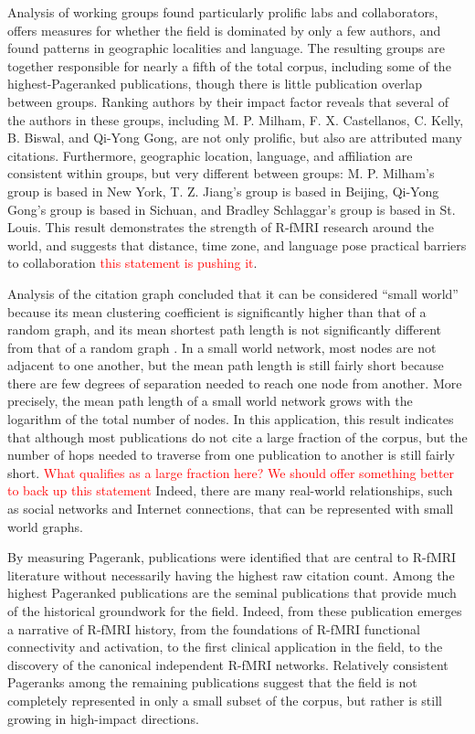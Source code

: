 \documentclass[5p]{elsarticle}
\begin{document}
Analysis of working groups found particularly prolific labs and collaborators,
offers measures for whether the field is dominated by only a few authors, and
found patterns in geographic localities and language. The resulting groups are
together responsible for nearly a fifth of the total corpus, including some of
the highest-Pageranked publications, though there is little publication overlap
between groups. Ranking authors by their impact factor reveals that several of
the authors in these groups, including M. P. Milham, F. X. Castellanos, C.
Kelly, B. Biswal, and Qi-Yong Gong, are not only prolific, but also are attributed many
citations. Furthermore, geographic location, language, and affiliation are
consistent within groups, but very different between groups: M. P. Milham’s group
is based in New York, T. Z. Jiang’s group is based in Beijing, Qi-Yong Gong’s
group is based in Sichuan, and Bradley Schlaggar’s group is based in St. Louis.
This result demonstrates the strength of R-fMRI research around the world, and
suggests that distance, time zone, and language pose practical barriers to
collaboration \textcolor{red}{this statement is pushing it}.

Analysis of the citation graph concluded that it can be considered ``small
world'' because its mean clustering coefficient is significantly higher than
that of a random graph, and its mean shortest path length is not significantly
different from that of a random graph \cite{Watts1998}. In a small world network, most nodes
are not adjacent to one another, but the mean path length is still fairly short
because there are few degrees of separation needed to reach one node from
another. More precisely, the mean path length of a small world network grows
with the logarithm of the total number of nodes. In this application, this
result indicates that although most publications do not cite a large fraction of the
corpus, but the number of hops needed to traverse from one publication to
another is still fairly short. \textcolor{red}{What qualifies as a large
fraction here? We should offer something better to back up this statement} Indeed, there are many real-world relationships,
such as social networks and Internet connections, that can be represented with
small world graphs. 

By measuring Pagerank, publications were identified that are central to R-fMRI
literature without necessarily having the highest raw citation count. Among the
highest Pageranked publications are the seminal publications that
provide much of the historical groundwork for the field. Indeed, from these
publication emerges a narrative of R-fMRI history, from the foundations of
R-fMRI functional connectivity and activation, to the first clinical application
in the field, to the discovery of the canonical independent R-fMRI networks.
Relatively consistent Pageranks among the remaining publications suggest that
the field is not completely represented in only a small subset of the corpus,
but rather is still growing in high-impact directions. 
\end{document}

